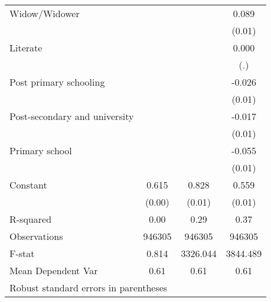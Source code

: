{\begin{tabular}{l*{3}{c}}
Widow/Widower       &                     &                     &       0.089\sym{***}\\
                    &                     &                     &      (0.01)         \\
Literate            &                     &                     &       0.000         \\
                    &                     &                     &         (.)         \\
Post primary schooling&                     &                     &      -0.026\sym{**} \\
                    &                     &                     &      (0.01)         \\
Post-secondary and university&                     &                     &      -0.017         \\
                    &                     &                     &      (0.01)         \\
Primary school      &                     &                     &      -0.055\sym{***}\\
                    &                     &                     &      (0.01)         \\
Constant            &       0.615\sym{***}&       0.828\sym{***}&       0.559\sym{***}\\
                    &      (0.00)         &      (0.01)         &      (0.01)         \\
\hline
R-squared           &        0.00         &        0.29         &        0.37         \\
Observations        &      946305         &      946305         &      946305         \\
F-stat              &       0.814         &    3326.044         &    3844.489         \\
Mean Dependent Var  &        0.61         &        0.61         &        0.61         \\
\hline\hline
\multicolumn{4}{l}{\footnotesize Robust standard errors in parentheses}\\
\end{tabular}
}
